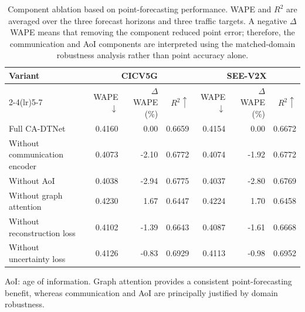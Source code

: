 \begin{table}[t]
\centering
\caption{Component ablation based on point-forecasting performance. WAPE and
$R^2$ are averaged over the three forecast horizons and three traffic targets.
A negative $\Delta$WAPE means that removing the component reduced point error;
therefore, the communication and AoI components are interpreted using the
matched-domain robustness analysis rather than point accuracy alone.}
\label{tab:component_ablation_point}
\setlength{\tabcolsep}{4.3pt}
\begin{tabular}{lrrrrrr}
\toprule
\multirow{2}{*}{Variant} &
\multicolumn{3}{c}{CICV5G} &
\multicolumn{3}{c}{SEE-V2X} \\
\cmidrule(lr){2-4}\cmidrule(lr){5-7}
& WAPE $\downarrow$ & $\Delta$WAPE (\%) & $R^2 \uparrow$
& WAPE $\downarrow$ & $\Delta$WAPE (\%) & $R^2 \uparrow$ \\
\midrule
Full CA-DTNet                    & 0.4160 &  0.00 & 0.6659 & 0.4154 &  0.00 & 0.6672 \\
Without communication encoder    & 0.4073 & -2.10 & 0.6772 & 0.4074 & -1.92 & 0.6772 \\
Without AoI                      & 0.4038 & -2.94 & 0.6775 & 0.4037 & -2.80 & 0.6769 \\
Without graph attention          & 0.4230 &  1.67 & 0.6447 & 0.4224 &  1.70 & 0.6458 \\
Without reconstruction loss      & 0.4102 & -1.39 & 0.6643 & 0.4087 & -1.61 & 0.6668 \\
Without uncertainty loss         & 0.4126 & -0.83 & 0.6929 & 0.4113 & -0.98 & 0.6952 \\
\bottomrule
\end{tabular}
\vspace{1mm}
\parbox{0.98\textwidth}{\footnotesize AoI: age of information. Graph attention
provides a consistent point-forecasting benefit, whereas communication and AoI
are principally justified by domain robustness.}
\end{table}

